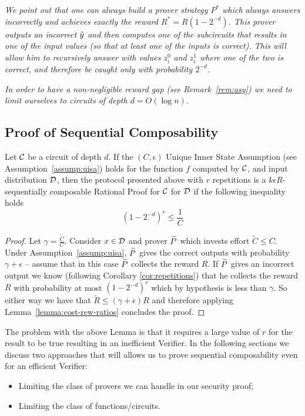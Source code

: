 \begin{remark}
\label{rem:match}
{\em 
We point out that one can always build a prover strategy 
$P^*$ which always answers incorrectly and achieves exactly the reward 
$R^*=R(1-2^{-d})$. This prover outputs an incorrect 
$\tilde{y}$ and then computes one of the subcircuits that results in one of the input values (so that at least one of the inputs is correct). This will allow him to recursively answer with values $z^0_i$ and $z^1_i$ where one of the two is correct, and therefore be caught only with probability $2^{-d}$.
}
\end{remark}

\begin{remark}
\label{rem:logd}
{\em 
In order to have a non-negligible reward gap (see Remark~\ref{rem:asy}) we need
to limit ourselves to circuits of depth $d=O(\log n)$. 
}
\end{remark}

\subsection{Proof of Sequential Composability}
\label{sec:proof-comp}


\begin{lemma}
	Let $\cal{C}$ be a circuit of depth $d$. If the $(C,\epsilon)$ Unique Inner State Assumption (see Assumption~\ref{assump:uisa}) holds for the function $f$ computed by $\cal C$, and input distribution $\cal D$, then the protocol presented above with $r$ repetitions is a $k\epsilon R$-sequentially composable Rational Proof for $\cal{C}$ for $\cal D$ if the following inequality holds 
	$$ (1-2^{-d})^r \leq \frac{1}{C} $$
\end{lemma}
\begin{proof}
	Let $\gamma=\frac{\tilde{C}}{C}$. 
Consider $x \in \cal D$ and prover $\widetilde{P}$ which invests effort $\tilde{C}\leq C$. Under Assumption~\ref{assump:uisa}, $\widetilde{P}$ gives the correct outputs
with probability $\gamma+\epsilon$ -- assume that in this case $\widetilde{P}$ collects the reward $R$. If $\widetilde{P}$ gives an incorrect output we know (following Corollary \ref{cor:repetitions}) that he collects the reward 
$R$ with probability at most $(1-2^{-d})^r$ which by hypothesis is less than $\gamma$. So either way we have that $\tilde{R} \leq (\gamma + \epsilon)R$ 
and therefore applying Lemma~\ref{lemma:cost-rew-ratios} concludes the proof.
\end{proof}
The problem with the above Lemma is that it requires a large value of $r$ for the result to be true resulting in an inefficient Verifier. In the following
sections we discuss two approaches that will allows us to prove sequential composability even for an efficient Verifier:
\begin{itemize}
\item Limiting the class of provers we can handle in our security proof;
\item Limiting the class of functions/circuits.
\end{itemize}

